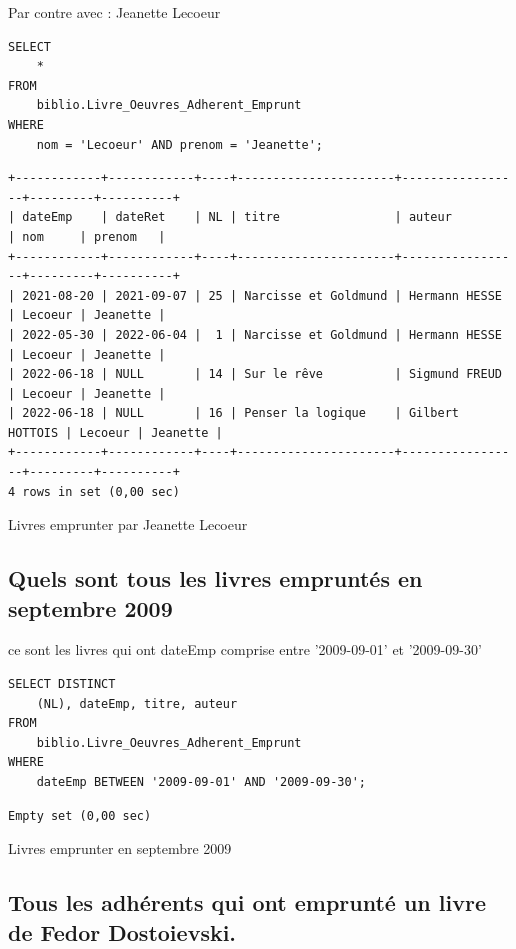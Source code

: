 \documentclass{article}
\begin{document}
Par contre avec : Jeanette Lecoeur
\begin{listing}[H]
\begin{verbatim}
SELECT 
	*
FROM
	biblio.Livre_Oeuvres_Adherent_Emprunt
WHERE
	nom = 'Lecoeur' AND prenom = 'Jeanette';
\end{verbatim}
\begin{verbatim}
+------------+------------+----+----------------------+-----------------+---------+----------+
| dateEmp    | dateRet    | NL | titre                | auteur          | nom     | prenom   |
+------------+------------+----+----------------------+-----------------+---------+----------+
| 2021-08-20 | 2021-09-07 | 25 | Narcisse et Goldmund | Hermann HESSE   | Lecoeur | Jeanette |
| 2022-05-30 | 2022-06-04 |  1 | Narcisse et Goldmund | Hermann HESSE   | Lecoeur | Jeanette |
| 2022-06-18 | NULL       | 14 | Sur le rêve          | Sigmund FREUD   | Lecoeur | Jeanette |
| 2022-06-18 | NULL       | 16 | Penser la logique    | Gilbert HOTTOIS | Lecoeur | Jeanette |
+------------+------------+----+----------------------+-----------------+---------+----------+
4 rows in set (0,00 sec)
\end{verbatim}
	\caption{Livres emprunter par Jeanette Lecoeur}
\end{listing}

\subsection{Quels sont tous les livres empruntés en septembre 2009}
ce sont les livres qui ont dateEmp comprise entre '2009-09-01' et '2009-09-30'
\begin{listing}[H]
\begin{verbatim}
SELECT DISTINCT
    (NL), dateEmp, titre, auteur
FROM
    biblio.Livre_Oeuvres_Adherent_Emprunt
WHERE
    dateEmp BETWEEN '2009-09-01' AND '2009-09-30';
\end{verbatim}
	\begin{verbatim}
Empty set (0,00 sec)
\end{verbatim}
	\caption{Livres emprunter en septembre 2009}
\end{listing}
\subsection{Tous les adhérents qui ont emprunté un livre de Fedor Dostoievski.}
\end{document}
